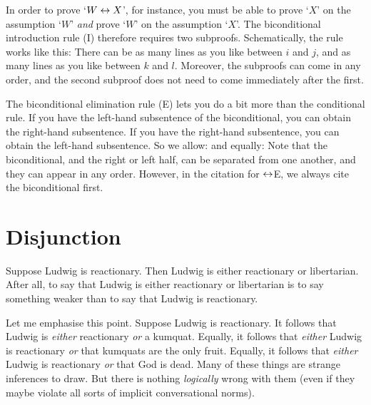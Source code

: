 In order to prove `$W \leftrightarrow X$', for instance, you must be able to prove `$X$' on the assumption `$W$' \emph{and} prove `$W$' on the assumption `$X$'. The biconditional introduction rule ({\eiff}I) therefore requires two subproofs. Schematically, the rule works like this:
There can be as many lines as you like between $i$ and $j$, and as many lines as you like between $k$ and $l$. Moreover, the subproofs can come in any order, and the second subproof does not need to come immediately after the first.

The biconditional elimination rule ({\eiff}E) lets you do a bit more than the conditional rule. If you have the left-hand subsentence of the biconditional, you can obtain the right-hand subsentence. If you have the right-hand subsentence, you can obtain the left-hand subsentence. So we allow:
and equally:
Note that the biconditional, and the right or left half, can be separated from one another, and they can appear in any order. However, in the citation for $\leftrightarrow$E, we always cite the biconditional first.

\section{Disjunction}
Suppose Ludwig is reactionary. Then Ludwig is either reactionary or libertarian. After all, to say that Ludwig is either reactionary or libertarian is to say something weaker than to say that Ludwig is reactionary. 

Let me emphasise this point. Suppose Ludwig is reactionary. It follows that Ludwig is \emph{either} reactionary \emph{or} a kumquat. Equally, it follows that \emph{either} Ludwig is reactionary \emph{or} that kumquats are the only fruit.  Equally, it follows that \emph{either} Ludwig is reactionary \emph{or} that God is dead. Many of these things are strange inferences to draw. But there is nothing \emph{logically} wrong with them (even if they maybe violate all sorts of implicit conversational norms).

